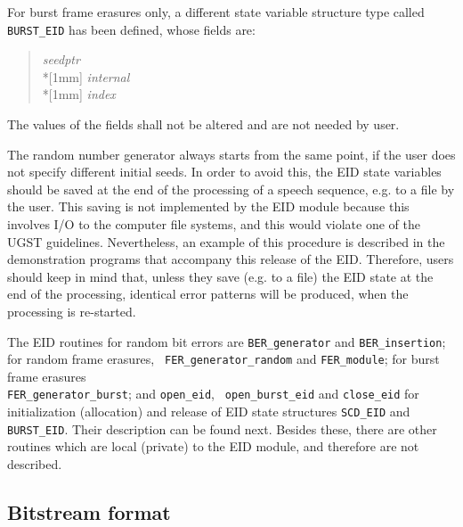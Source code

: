 For burst frame erasures only, a different state variable structure type
called {\tt BURST\_EID} has been defined, whose fields are:
\begin{quote} \normalsize
 {\em seedptr}     \hfill {}\\*[1mm]
 {\em internal}  \hfill {}\\*[1mm]
 {\em index} \hfill {}\\
\end{quote}

The values of the fields shall not be altered and are not needed by user.

The random number generator always starts from the same point, if the user
does not specify different initial seeds. In order to avoid this, the
EID state variables should be saved at the end of the processing of a
speech sequence, e.g. to a file by the user. This saving is not
implemented by the EID module because this involves I/O to the computer
file systems, and this would violate one of the UGST guidelines. Nevertheless,
an example of this procedure is described in the demonstration programs that
accompany this release of the EID. Therefore, users should keep in
mind that, unless they save (e.g. to a file) the EID state at the end of
the processing, identical error patterns will be produced, when the
processing is re-started.

The EID routines for random bit errors are {\tt BER\_generator} and
{\tt BER\_insertion}; for random frame erasures, {\tt
FER\_generator\_random} and {\tt FER\_module}; for burst frame
erasures\\ {\tt FER\_generator\_burst}; and {\tt open\_eid}, {\tt
open\_burst\_eid} and {\tt close\_eid} for initialization (allocation)
and release of EID state structures {\tt SCD\_EID} and {\tt
BURST\_EID}. Their description can be found next. Besides these, there
are other routines which are local (private) to the EID module, and
therefore are not described.

\subsection{Bitstream format}\label{sec:g192bitstream}


